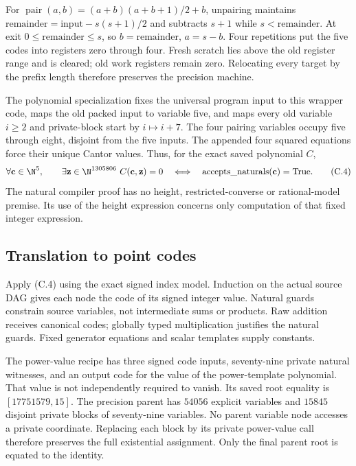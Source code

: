 For $\operatorname{pair}(a,b)=(a+b)(a+b+1)/2+b$, unpairing maintains
$\text{remainder}=\text{input}-s(s+1)/2$ and subtracts $s+1$
while $s<\text{remainder}$. At exit
$0\le\text{remainder}\le s$, so $b=\text{remainder}$, $a=s-b$.
Four repetitions put the five codes into registers zero through four.
Fresh scratch lies above the old register range and is cleared;
old work registers remain zero. Relocating every target by the prefix
length therefore preserves the precision machine.

The polynomial specialization fixes the universal program input to
this wrapper code, maps the old packed input to variable five, and
maps every old variable $i\ge2$ and private-block start by $i\mapsto i+7$.
The four pairing variables occupy five through eight, disjoint from
the five inputs. The appended four squared equations force their
unique Cantor values. Thus, for the exact saved polynomial $C$,
\[
 \forall\mathbf c\in\N^5,\qquad
 \exists\mathbf z\in\N^{1305806}\ C(\mathbf c,\mathbf z)=0
 \quad\Longleftrightarrow\quad
        \operatorname{accepts\_naturals}(\mathbf c)=\mathrm{True}. \tag{C.4}
\]
The natural compiler proof has no height, restricted-converse or
rational-model premise. Its use of the height expression concerns
only computation of that fixed integer expression.

\subsection{Translation to point codes}
Apply (C.4) using the exact signed index model. Induction on the actual
source DAG gives each node the code of its signed integer value.
Natural guards constrain source variables, not intermediate sums or
products. Raw addition receives canonical codes; globally typed
multiplication justifies the natural guards. Fixed generator equations
and scalar templates supply constants.

The power-value recipe has three signed code inputs, seventy-nine
private natural witnesses, and an output code for the value of the
power-template polynomial. That value is not independently required
to vanish. Its saved root equality is $[17751579,15]$.
The precision parent has $54056$ explicit variables and $15845$
disjoint private blocks of seventy-nine variables. No parent variable
node accesses a private coordinate. Replacing each block by its
private power-value call therefore preserves the full existential
assignment. Only the final parent root is equated to the identity.

